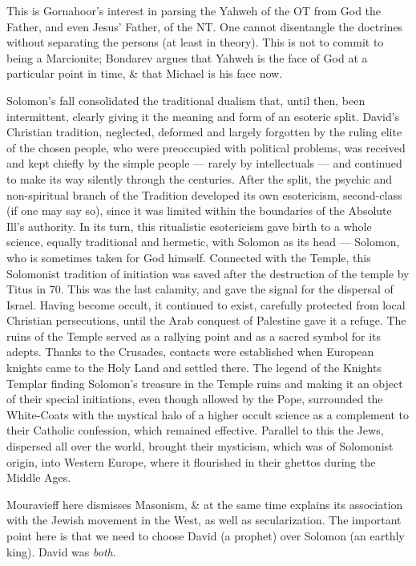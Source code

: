 This is Gornahoor's interest in parsing the Yahweh of the OT from God the Father, and even Jesus' Father, of the NT. One cannot disentangle the doctrines without separating the persons (at least in theory). This is not to commit to being a Marcionite; Bondarev argues that Yahweh is the face of God at a particular point in time, \& that Michael is his face now.

\begin{quotex}
Solomon's fall consolidated the traditional dualism that, until then, been intermittent, clearly giving it the meaning and form of an esoteric split. David's Christian tradition, neglected, deformed and largely forgotten by the ruling elite of the chosen people, who were preoccupied with political problems, was received and kept chiefly by the simple people --- rarely by intellectuals --- and continued to make its way silently through the centuries. After the split, the psychic and non-spiritual branch of the Tradition developed its own esotericism, second-class (if one may say so), since it was limited within the boundaries of the Absolute Ill's authority. In its turn, this ritualistic esotericism gave birth to a whole science, equally traditional and hermetic, with Solomon as its head --- Solomon, who is sometimes taken for God himself. Connected with the Temple, this Solomonist tradition of initiation was saved after the destruction of the temple by Titus in 70. This was the last calamity, and gave the signal for the dispersal of Israel. Having become occult, it continued to exist, carefully protected from local Christian persecutions, until the Arab conquest of Palestine gave it a refuge. The ruins of the Temple served as a rallying point and as a sacred symbol for its adepts. Thanks to the Crusades, contacts were established when European knights came to the Holy Land and settled there. The legend of the Knights Templar finding Solomon's treasure in the Temple ruins and making it an object of their special initiations, even though allowed by the Pope, surrounded the White-Coats with the mystical halo of a higher occult science as a complement to their Catholic confession, which remained effective. Parallel to this the Jews, dispersed all over the world, brought their mysticism, which was of Solomonist origin, into Western Europe, where it flourished in their ghettos during the Middle Ages.
\end{quotex}


Mouravieff here dismisses Masonism, \& at the same time explains its association with the Jewish movement in the West, as well as secularization. The important point here is that we need to choose David (a prophet) over Solomon (an earthly king). David was \emph{both}.

